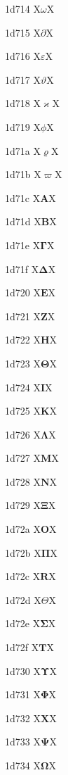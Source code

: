 \documentclass[11pt]{article}
\begin{document}
1d714 X{\ensuremath{\mathit{\omega}}}X

1d715 X{\ensuremath{\mathit{\partial}}}X

1d716 X{\ensuremath{\mathit{\varepsilon}}}X

1d717 X{\ensuremath{\mathit{\vartheta}}}X

1d718 X{\ensuremath{\mathit{\varkappa}}}X

1d719 X{\ensuremath{\mathit{\phi}}}X

1d71a X{\ensuremath{\mathit{\varrho}}}X

1d71b X{\ensuremath{\mathit{\varpi}}}X

1d71c X{\ensuremath{\boldsymbol{A}}}X

1d71d X{\ensuremath{\boldsymbol{B}}}X

1d71e X{\ensuremath{\boldsymbol{\Gamma}}}X

1d71f X{\ensuremath{\boldsymbol{\Delta}}}X

1d720 X{\ensuremath{\boldsymbol{E}}}X

1d721 X{\ensuremath{\boldsymbol{Z}}}X

1d722 X{\ensuremath{\boldsymbol{H}}}X

1d723 X{\ensuremath{\boldsymbol{\Theta}}}X

1d724 X{\ensuremath{\boldsymbol{I}}}X

1d725 X{\ensuremath{\boldsymbol{K}}}X

1d726 X{\ensuremath{\boldsymbol{\Lambda}}}X

1d727 X{\ensuremath{\boldsymbol{M}}}X

1d728 X{\ensuremath{\boldsymbol{N}}}X

1d729 X{\ensuremath{\boldsymbol{\Xi}}}X

1d72a X{\ensuremath{\boldsymbol{O}}}X

1d72b X{\ensuremath{\boldsymbol{\Pi}}}X

1d72c X{\ensuremath{\boldsymbol{R}}}X

1d72d X{\ensuremath{\boldsymbol{\varTheta}}}X

1d72e X{\ensuremath{\boldsymbol{\Sigma}}}X

1d72f X{\ensuremath{\boldsymbol{T}}}X

1d730 X{\ensuremath{\boldsymbol{\Upsilon}}}X

1d731 X{\ensuremath{\boldsymbol{\Phi}}}X

1d732 X{\ensuremath{\boldsymbol{X}}}X

1d733 X{\ensuremath{\boldsymbol{\Psi}}}X

1d734 X{\ensuremath{\boldsymbol{\Omega}}}X
\end{document}
